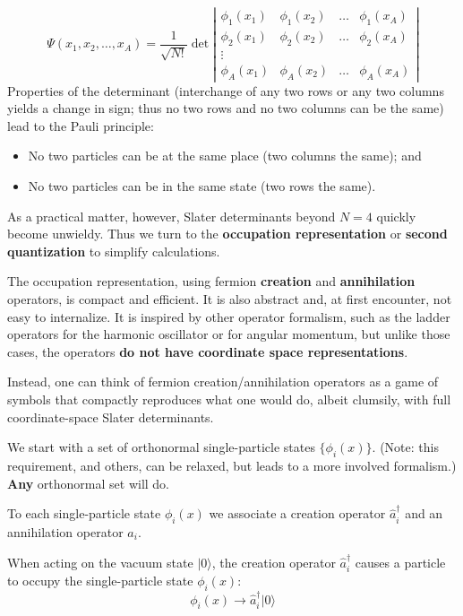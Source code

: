 \documentclass[graybox,sectrefs,envcountresetchap,open=right]{svmonodo}
\begin{document}
\[
\Psi(x_1, x_2, \ldots, x_A) 
= \frac{1}{\sqrt{N!}} 
\det \left | 
\begin{array}{cccc}
\phi_1(x_1) & \phi_1(x_2) & \ldots & \phi_1(x_A) \\
\phi_2(x_1) & \phi_2(x_2) & \ldots & \phi_2(x_A) \\
 \vdots & & &  \\
\phi_A(x_1) & \phi_A(x_2) & \ldots & \phi_A(x_A) 
\end{array}
\right |
\]
Properties of the determinant (interchange of any two rows or 
any two columns yields a change in sign; thus no two rows and no 
two columns can be the same) lead to the Pauli principle:

\begin{itemize}
\item No two particles can be at the same place (two columns the same); and

\item No two particles can be in the same state (two rows the same).
\end{itemize}

\noindent
As a practical matter, however, Slater determinants beyond $N=4$ quickly become 
unwieldy. Thus we turn to the \textbf{occupation representation} or \textbf{second quantization} to simplify calculations. 

The occupation representation, using fermion \textbf{creation} and \textbf{annihilation} 
operators, is compact and efficient. It is also abstract and, at first encounter, not easy to 
internalize. It is inspired by other operator formalism, such as the ladder operators for 
the harmonic oscillator or for angular momentum, but unlike those cases, the operators \textbf{do not have coordinate space representations}.

Instead, one can think of fermion creation/annihilation operators as a game of symbols that 
compactly reproduces what one would do, albeit clumsily, with full coordinate-space Slater 
determinants. 


We start with a set of orthonormal single-particle states $\{ \phi_i(x) \}$. 
(Note: this requirement, and others, can be relaxed, but leads to a 
more involved formalism.) \textbf{Any} orthonormal set will do. 

To each single-particle state $\phi_i(x)$ we associate a creation operator 
$\hat{a}^\dagger_i$ and an annihilation operator $\hat{a}_i$. 

When acting on the vacuum state $| 0 \rangle$, the creation operator $\hat{a}^\dagger_i$ causes 
a particle to occupy the single-particle state $\phi_i(x)$:
\[
\phi_i(x) \rightarrow \hat{a}^\dagger_i |0 \rangle
\]
\end{document}
